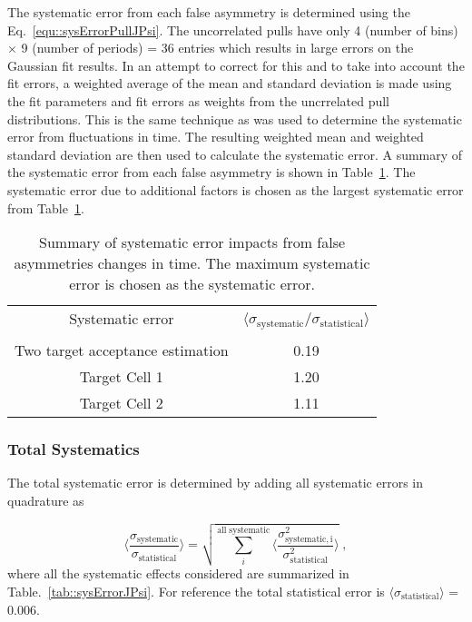 The systematic error from each false asymmetry is determined using the
Eq.~\ref{equ::sysErrorPullJPsi}.  The uncorrelated pulls have only 4 (number of
bins) $\times$ 9 (number of periods) = 36 entries which results in large errors
on the Gaussian fit results.  In an attempt to correct for this and to take into
account the fit errors, a weighted average of the mean and standard deviation is
made using the fit parameters and fit errors as weights from the uncrrelated
pull distributions.  This is the same technique as was used to determine the
systematic error from fluctuations in time.  The resulting weighted mean and
weighted standard deviation are then used to calculate the systematic error.  A
summary of the systematic error from each false asymmetry is shown in
Table~\ref{tab::faSysJPsi}.  The systematic error due to additional factors is
chosen as the largest systematic error from Table~\ref{tab::faSysJPsi}.

\begin{table}[h!t]
  \centering
  \begin{tabular}{|c|c|}
    \hline Systematic error& \multirow{2}{9em}{$\langle
      \sigma_{\mathrm{systematic}}/\sigma_{\mathrm{statistical}}
      \rangle$}\\ & \\ \hline

    Two target acceptance estimation& 0.19\\ \hline
    
    Target Cell 1& 1.20\\ \hline

    Target Cell 2& 1.11\\ \hline
    
  \end{tabular}
  \caption{Summary of systematic error impacts from false asymmetries changes in
    time.  The maximum systematic error is chosen as the systematic error.}
  \label{tab::faSysJPsi}
\end{table}

\subsubsection{Total Systematics}
The total systematic error is determined by adding all systematic errors in
quadrature as

\begin{equation}
  \Big \langle \frac{
    \sigma_{\mathrm{systematic}}}{\sigma_{\mathrm{statistical}}} \Big \rangle =
  \sqrt{ \sum_i^{\mathrm{all \; systematic}} \Big \langle
    \frac{\sigma^2_{\mathrm{systematic, i}}}{\sigma^2_{\mathrm{statistical}}}
    \Big \rangle } \;,
\end{equation}
where all the systematic effects considered are summarized in
Table.~\ref{tab::sysErrorJPsi}.  For reference the total statistical error is
$\langle \sigma_{\mathrm{statistical}} \rangle$ = 0.006.

